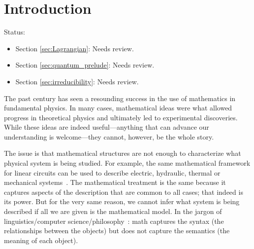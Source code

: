 \documentclass[smallextended]{svjour3}
\numberwithin{equation}{section}
\theoremstyle{definition}
\begin{document}
\ifjournal
\else
	\maketitle
\fi


\section{Introduction}

Status:
\begin{itemize}




\item Section \ref{sec:Lagrangian}: Needs review.

\item Section \ref{sec:quantum_prelude}: Needs review.

\item Section \ref{sec:irreducibility}: Needs review.
\end{itemize}

The past century has seen a resounding success in the use of mathematics in fundamental physics. In many cases, mathematical ideas were what allowed progress in theoretical physics and ultimately led to experimental discoveries. While these ideas are indeed useful---anything that can advance our understanding is welcome---they cannot, however, be the whole story.

The issue is that mathematical structures are not enough to characterize what physical system is being studied. For example, the same mathematical framework for linear circuits can be used to describe electric, hydraulic, thermal or mechanical systems~\cite{Roland,Barron,Borutzky}. The mathematical treatment is the same because it captures aspects of the description that are common to all cases; that indeed is its power. But for the very same reason, we cannot infer what system is being described if all we are given is the mathematical model. In the jargon of linguistics/computer science/philosophy~\cite{Freidin,Friedman}: math captures the syntax (the relationships between the objects) but does not capture the semantics (the meaning of each object).
\end{document}
